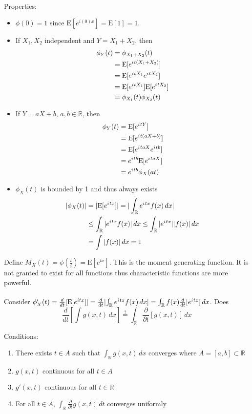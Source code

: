 \documentclass[12pt]{article}
\newcommand{\expected}[1]{\mathrm{E}[#1]}
\renewcommand{\i}{{i\mkern1mu}}
\begin{document}
Properties: \begin{itemize} 
\item $\phi(0) = 1$ since $\expected{e^{i(0)x}} = \expected{1} = 1$. 
\item If $X_1, X_2$ independent and $Y = X_1 + X_2$, then $$ \begin{aligned} \phi_Y(t) &= \phi_{X_1 + X_2}(t) \\ &= \expected{e^{\i t(X_1 + X_2)}} \\ &= \expected{e^{\i tX_1} e^{\i tX_2}} \\ &= \expected{e^{\i tX_1}} \expected{e^{\i tX_2}} \\ &= \phi_{X_1}(t)\phi_{X_2}(t) \end{aligned} $$ 
\item If $Y = aX + b$, $a,b \in \mathbb{R}$, then $$ \begin{aligned} \phi_Y(t) &= \expected{e^{\i tY}} \\ &= \expected{e^{\i t(aX + b)}} \\ &= \expected{e^{\i taX} e^{\i tb}} \\ &= e^{\i tb} \expected{e^{\i taX}} \\ &= e^{\i tb} \phi_X(at) \end{aligned} $$ 
\item $\phi_X(t)$ is bounded by 1 and thus always exists $$ \begin{aligned} | \phi_X(t)| &= | \expected{e^{\i tx}}| = | \int_{\mathbb{R}} e^{\i tx} f(x) \, dx| \\ &\leq \int_{\mathbb{R}} |e^{\i tx} f(x)| \, dx \leq \int_{\mathbb{R}} |e^{\i tx}| |f(x)| \, dx \\ &= \int |f(x)| \, dx = 1 \end{aligned} $$ \end{itemize} 

Define $M_X(t) = \phi(\frac{t}{i}) = \expected{e^{tx}}$. This is the moment generating function. It is not granted to exist for all functions thus characteristic functions are more powerful. \\~\\

Consider $\phi'_X(t) = \frac{d}{dt} [\expected{e^{itx}}] = \frac{d}{dt} [ \int_{\mathbb{R}} e^{\i tx} f(x) \, dx] = \int_{\mathbb{R}} f(x) \frac{d}{dt} [e^{\i tx}] \, dx$. Does $$ \frac{d}{dt} [\int g(x,t) \, dx] \stackrel{?}{=} \int_{\mathbb{R}} \frac{\partial}{\partial t} [g(x,t)] \, dx $$ 

Conditions: \begin{enumerate} 
\item There exists $ t \in A$ such that $\int_{\mathbb{R}} g(x,t)\,dx$ converges where $A = [a,b] \subset \mathbb{R}$ 
\item $g(x,t)$ continuous for all $t \in A$ 
\item $g'(x,t)$ continuous for all $t \in \mathbb{R}$
\item For all $t \in A$, $\int_{\mathbb{R}} \frac{\partial}{\partial t} g(x,t)\,dt$ converges uniformly \end{enumerate} 
\end{document}
